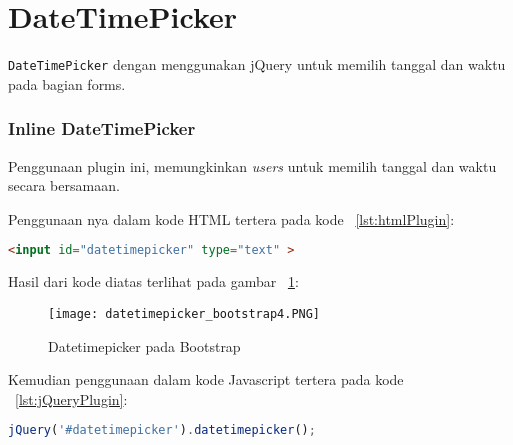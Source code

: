 \section{DateTimePicker}
\texttt{DateTimePicker} dengan menggunakan jQuery untuk memilih tanggal dan waktu pada bagian forms. 
\subsubsection{Inline DateTimePicker}
Penggunaan plugin ini, memungkinkan \textit{users} untuk memilih tanggal dan waktu secara bersamaan.

Penggunaan nya dalam kode HTML tertera pada kode ~\ref{lst:htmlPlugin}:
\begin{lstlisting}[style=customhtml, language=HTML,  basicstyle=\ttfamily, frame=single, columns=fullflexible, keepspaces=true, breaklines=true, showstringspaces=false, label={lst:htmlPlugin}, caption=Kode HTML pada plugin.] 
<input id="datetimepicker" type="text" >
\end{lstlisting}

\noindent Hasil dari kode diatas terlihat pada gambar ~\ref{fig:datetimepickerBootstrap}:
\begin{figure} [H]
	\centering  
	\texttt{[image: datetimepicker\_bootstrap4.PNG]}  
	\caption{Datetimepicker pada Bootstrap} 
	\label{fig:datetimepickerBootstrap}
\end{figure}

Kemudian penggunaan dalam kode Javascript tertera pada kode ~\ref{lst:jQueryPlugin}:

\begin{lstlisting}[style=JavaScript, language=JavaScript,  basicstyle=\ttfamily, frame=single, columns=fullflexible, keepspaces=true, breaklines=true, showstringspaces=false, label={lst:jQueryPlugin}, caption=Kode Inline DateTimePicker di jQuery.] 
jQuery('#datetimepicker').datetimepicker();
\end{lstlisting}




